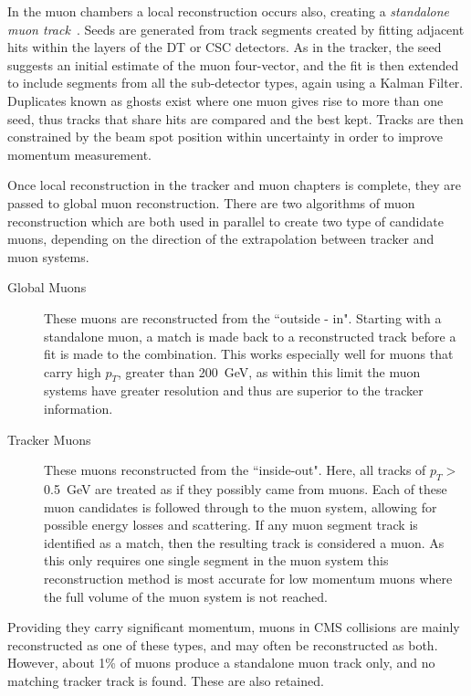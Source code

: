 In the muon chambers a local reconstruction occurs also, creating a \textit{standalone muon track}~\cite{muonperf}. Seeds are generated from track segments created by fitting adjacent hits within the layers of the DT or CSC detectors. As in the tracker, the seed suggests an initial estimate of the muon four-vector, and the fit is then extended to include segments from all the sub-detector types, again using a Kalman Filter. Duplicates known as ghosts exist where one muon gives rise to more than one seed, thus tracks that share hits are compared and the best kept. Tracks are then constrained by the beam spot position within uncertainty in order to improve momentum measurement. 

Once local reconstruction in the tracker and muon chapters is complete, they are passed to global muon reconstruction. There are two algorithms of muon reconstruction which are both used in parallel to create two type of candidate muons, depending on the direction of the extrapolation between tracker and muon systems. 

\begin{description}
\item[Global Muons]{These muons are reconstructed from the ``outside - in". Starting with a standalone muon, a match is made back to a reconstructed track before a fit is made to the combination. This works especially well for muons that carry high $p_{T}$, greater than 200~GeV, as within this limit the muon systems have greater resolution and thus are superior to the tracker information.}
\item[Tracker Muons]{These muons reconstructed from the ``inside-out". Here, all tracks of $p_{T} >$ 0.5~GeV are treated as if they possibly came from muons. Each of these muon candidates is followed through to the muon system, allowing for possible energy losses and scattering.  If any muon segment track is identified as a match, then the resulting track is considered a muon. As this only requires one single segment in the muon system this reconstruction method is most accurate for low momentum muons where the full volume of the muon system is not reached.}

\end{description}

Providing they carry significant momentum, muons in CMS collisions are mainly reconstructed as one of these types, and may often be reconstructed as both. However, about 1\% of muons produce a standalone muon track only, and no matching tracker track is found. These are also retained. 

